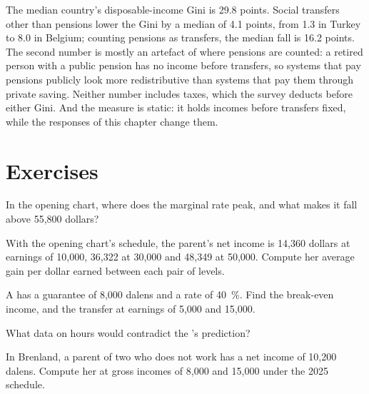 The median country's disposable-income Gini is 29.8 points. Social transfers other
than pensions lower the Gini by a median of 4.1 points, from 1.3 in Turkey to 8.0
in Belgium; counting pensions as transfers, the median fall is 16.2 points. The
second number is mostly an artefact of where pensions are counted: a retired person
with a public pension has no income before transfers, so systems that pay pensions
publicly look more redistributive than systems that pay them through private saving.
Neither number includes taxes, which the survey deducts before either Gini. And the
measure is static: it holds incomes before transfers fixed, while the responses of
this chapter change them.

\section{Exercises}\label{sec:b3:transfers-and-incentives:exercises}

\begin{exercise}[$\star$]\label{exo:b3:transfers-and-incentives:1}
In the opening chart, where does the marginal rate peak, and what makes it fall above
55{,}800 dollars?
\end{exercise}

\begin{exercise}[$\star$]\label{exo:b3:transfers-and-incentives:2}
With the opening chart's schedule, the parent's net income is 14{,}360 dollars at
earnings of 10{,}000, 36{,}322 at 30{,}000 and 48{,}349 at 50{,}000. Compute her average gain per
dollar earned between each pair of levels.
\end{exercise}

\begin{exercise}[$\star$]\label{exo:b3:transfers-and-incentives:3}
A  has a guarantee of 8{,}000 dalens and a rate of 40~\%. Find the
break-even income, and the transfer at earnings of 5{,}000 and 15{,}000.
\end{exercise}

\begin{exercise}[$\star$]\label{exo:b3:transfers-and-incentives:4}
What data on hours would contradict the 's prediction?
\end{exercise}

\begin{exercise}[$\star\star$]\label{exo:b3:transfers-and-incentives:5}
In Brenland, a parent of two who does not work has a net income of 10{,}200 dalens.
Compute her  at gross incomes of 8{,}000 and 15{,}000 under the 2025
schedule.
\end{exercise}

